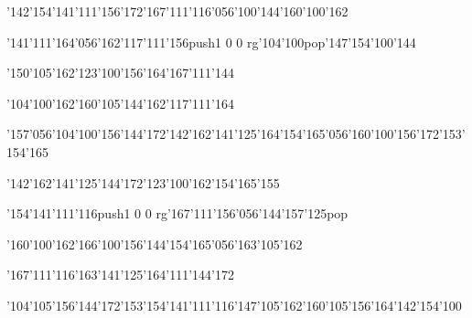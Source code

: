 \null\vfill\ipa\centerline{\enskip\char'142\char'154\char'141\char'111\char'156\char'172\enskip\enskip\enskip\enskip\char'167\char'111\char'116\char'056\char'100\char'144\enskip\enskip\enskip\char'160\char'100\char'162\enskip\enskip\enskip\enskip}\medskip\centerline{\enskip\char'141\char'111\char'164\char'056\char'162\char'117\char'111\char'156\enskip\pdfcolorstack\match push{1 0 0 rg}\char'104\char'100\pdfcolorstack\match pop{}\enskip\enskip\enskip\enskip\enskip\enskip\enskip\enskip\char'147\char'154\char'100\char'144}\medskip\centerline{\enskip\char'150\char'105\char'162\enskip\enskip\enskip\enskip\char'123\char'100\char'156\char'164\enskip\enskip\enskip\char'167\char'111\char'144}\medskip\centerline{\enskip\enskip\enskip\enskip\char'104\char'100\char'162\enskip\char'160\char'105\char'144\enskip\char'162\char'117\char'111\char'164\enskip\enskip\enskip\enskip\enskip\enskip\enskip\enskip\enskip}\medskip\centerline{\enskip\char'157\char'056\char'104\char'100\char'156\char'144\char'172\enskip\enskip\enskip\char'142\char'162\char'141\char'125\char'164\enskip\enskip\enskip\enskip\char'154\char'165\char'056\char'160\char'100\char'156\char'172\enskip\char'153\char'154\char'165}\medskip\vfill\footline{\hfil\tt\folio\hfil}\eject
\null\vfill\ipa\centerline{\enskip\char'142\char'162\char'141\char'125\char'144\char'172\enskip\enskip\enskip\enskip\enskip\enskip\enskip\enskip\enskip\enskip\enskip\enskip\char'123\char'100\char'162\enskip\char'154\char'165\char'155}\medskip\centerline{\enskip\enskip\enskip\enskip\char'154\char'141\char'111\char'116\enskip\enskip\enskip\enskip\pdfcolorstack\match push{1 0 0 rg}\char'167\char'111\char'156\char'056\char'144\char'157\char'125\pdfcolorstack\match pop{}\enskip\enskip\enskip\enskip\enskip}\medskip\centerline{\enskip\char'160\char'100\char'162\enskip\enskip\enskip\enskip\char'166\char'100\char'156\char'144\enskip\char'154\char'165\char'056\char'163\char'105\char'162}\medskip\centerline{\enskip\enskip\enskip\enskip\enskip\enskip\enskip\enskip\char'167\char'111\char'116\enskip\char'163\char'141\char'125\char'164\enskip\char'111\char'144\char'172\enskip\enskip\enskip\enskip\enskip}\medskip\centerline{\enskip\enskip\char'104\char'105\char'156\char'144\char'172\enskip\enskip\enskip\char'153\char'154\char'141\char'111\char'116\enskip\char'147\char'105\char'162\enskip\enskip\enskip\char'160\char'105\char'156\char'164\enskip\char'142\char'154\char'100}\medskip\vfill\footline{\hfil\tt\folio\hfil}\eject
